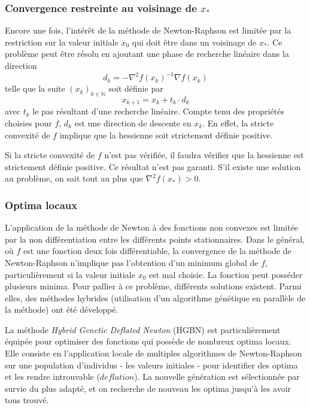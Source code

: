\documentclass[3p, twocolumn]{elsarticle}
\begin{document}
\subsubsection{Convergence restreinte au voisinage de $x_*$}
Encore une fois, l'intérêt de la méthode de Newton-Raphson est limitée par la restriction sur la valeur initiale $x_0$ qui doit être dans un voisinage de $x_*$.
Ce problème peut être résolu en ajoutant une phase de recherche linéaire dans la direction
\begin{equation*}
    d_{k} = -\nabla ^{2}f(x_{k})^{-1} \nabla f(x_{k})
\end{equation*}
telle que la suite $(x_k)_{k\in \mathbb{N}}$ soit définie par
\begin{equation}
    x_{k+1}=x_k+t_k\cdot d_k
    \label{eq:nr-opt-mono}
\end{equation} 
avec $t_k$ le pas résultant d'une recherche linéaire.
Compte tenu des propriétés choisies pour $f$, $d_k$ est une direction de descente en $x_k$. En effet, la stricte convexité de $f$ implique que la hessienne soit strictement définie positive.
\begin{rmk}
    Si la stricte convexité de $f$ n'est pas vérifiée, il faudra vérifier que la hessienne est strictement définie positive. Ce résultat n'est pas garanti. S'il existe une solution au problème, on sait tout au plus que $\nabla^2f(x_*)>0$.
\end{rmk}

\subsubsection{Optima locaux}
L'application de la méthode de Newton à des fonctions non convexes est limitée par la non différentiation entre les différents points stationnaires. Dans le général, où $f$ est une fonction deux fois différentiable, la convergence de la méthode de Newton-Raphson n'implique pas l'obtention d'un minimum global de $f$, particulièrement si la valeur initiale $x_0$ est mal choisie. La fonction peut posséder plusieurs minima. Pour pallier à ce problème, différents solutions existent. Parmi elles, des méthodes hybrides (utilisation d'un algorithme génétique en parallèle de la méthode) ont été développé.

La méthode \textit{Hybrid Genetic Deflated Newton} (HGBN) \cite{art:Noack_Funke_2017} est particulièrement équipée pour optimiser des fonctions qui possède de nombreux optima locaux. Elle consiste en l'application locale de multiples algorithmes de Newton-Raphson sur une population d'individus - les valeurs initiales - pour identifier des optima et les rendre introuvable ($deflation$). La nouvelle génération est sélectionnée par survie du plus adapté, et on recherche de nouveau les optima jusqu'à les avoir tous trouvé.
\end{document}
